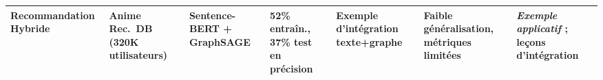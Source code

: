 \begin{landscape}
\begin{longtable}{|p{2.0cm}|p{2.0cm}|p{2.8cm}|p{3.5cm}|p{3.0cm}|p{3.0cm}|p{3.8cm}|}
Recommandation Hybride \cite{anime_hybrid_gnn_bert} &
Anime Rec.\ DB (320K utilisateurs) &
Sentence-BERT + GraphSAGE &
52\% entraîn., 37\% test en précision &
Exemple d'intégration texte+graphe &
Faible généralisation, métriques limitées &
\textit{Exemple applicatif} ; leçons d'intégration \\
\hline

\end{longtable}
\end{landscape}